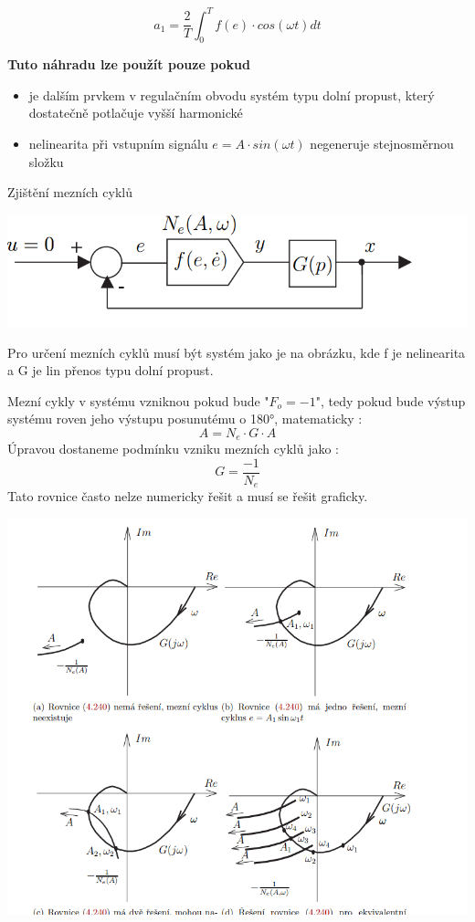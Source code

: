 \begin{equation*}
    a_1=\frac{2}{T} \int_{0}^{T} f(e) \cdot cos(\omega t) dt
\end{equation*}

{\bf Tuto náhradu lze použít pouze pokud}
\begin{itemize}
    \item je dalším prvkem v regulačním obvodu systém typu dolní propust, který dostatečně potlačuje vyšší harmonické
    \item nelinearita při vstupním signálu $e=A\cdot sin (\omega t) $ negeneruje stejnosměrnou složku
\end{itemize}


Zjištění mezních cyklů 

\includegraphics{img/harm.rovnovha.png}

Pro určení mezních cyklů musí být systém jako je na obrázku, kde f je nelinearita a G je lin přenos typu dolní propust.

Mezní cykly v systému vzniknou pokud bude "$ F_o =-1 $", tedy pokud bude výstup systému 
roven jeho výstupu posunutému o 180°, matematicky :
\begin{equation*}
    A= N_e \cdot G \cdot A
\end{equation*}
Úpravou dostaneme podmínku vzniku mezních cyklů jako :
\begin{equation*}
    G=\frac{-1}{N_e}
\end{equation*}
Tato rovnice často nelze numericky řešit a musí se řešit graficky.

\includegraphics{img/garf.reseni.png}

